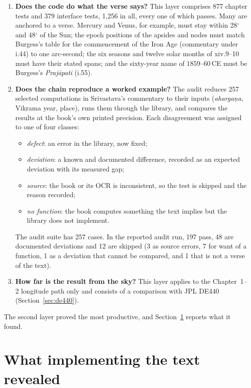 \documentclass[11pt,a4paper]{article}
\begin{document}
\begin{enumerate}
  \item \textbf{Does the code do what the verse says?} This layer comprises 877 chapter tests and 379 interface tests, 1,256 in all, every one of which passes. Many are anchored to a verse. Mercury and Venus, for example, must stay within 28$^\circ$ and 48$^\circ$ of the Sun; the epoch positions of the apsides and nodes must match Burgess's table for the commencement of the Iron Age (commentary under i.44) to one arc-second; the six seasons and twelve solar months of xiv.9--10 must have their stated spans; and the sixty-year name of 1859--60\,CE must be Burgess's \textit{Praj\=apati} (i.55).
  \item \textbf{Does the chain reproduce a worked example?} The audit reduces 257 selected computations in Srivastava's commentary to their inputs (\textit{aharga\d{n}a}, Vikrama year, place), runs them through the library, and compares the results at the book's own printed precision. Each disagreement was assigned to one of four classes:
  \begin{itemize}
    \item \emph{defect}: an error in the library, now fixed;
    \item \emph{deviation}: a known and documented difference, recorded as an expected deviation with its measured gap;
    \item \emph{source}: the book or its OCR is inconsistent, so the test is skipped and the reason recorded;
    \item \emph{no function}: the book computes something the text implies but the library does not implement.
  \end{itemize}
  The audit suite has 257 cases. In the reported audit run, 197 pass, 48 are documented deviations and 12 are skipped (3 as source errors, 7 for want of a function, 1 as a deviation that cannot be compared, and 1 that is not a verse of the text).
  \item \textbf{How far is the result from the sky?} This layer applies to the Chapter~1--2 longitude path only and consists of a comparison with JPL DE440 (Section~\ref{sec:de440}).
\end{enumerate}

The second layer proved the most productive, and Section~\ref{sec:findings} reports what it found.

\section{What implementing the text revealed}
\label{sec:findings}
\end{document}
